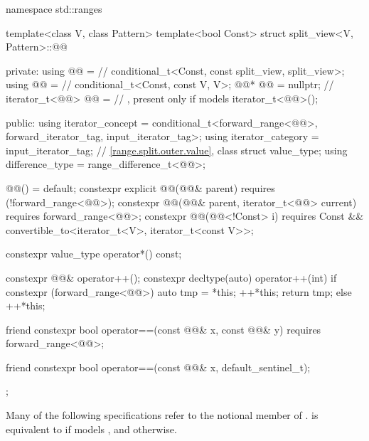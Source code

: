 %
\begin{codeblock}
namespace std::ranges {
  template<class V, class Pattern>
  template<bool Const>
  struct split_view<V, Pattern>::@@ {
  private:
    using @@ =                          // \expos
      conditional_t<Const, const split_view, split_view>;
    using @@   =                          // \expos
      conditional_t<Const, const V, V>;
    @@* @@ = nullptr;              // \expos
    iterator_t<@@> @@ =             // \expos, present only if  models 
      iterator_t<@@>();

  public:
    using iterator_concept  =
      conditional_t<forward_range<@@>, forward_iterator_tag, input_iterator_tag>;
    using iterator_category = input_iterator_tag;
    // \ref{range.split.outer.value}, class 
    struct value_type;
    using difference_type   = range_difference_t<@@>;

    @@() = default;
    constexpr explicit @@(@@& parent)
      requires (!forward_range<@@>);
    constexpr @@(@@& parent, iterator_t<@@> current)
      requires forward_range<@@>;
    constexpr @@(@@<!Const> i)
      requires Const && convertible_to<iterator_t<V>, iterator_t<const V>>;

    constexpr value_type operator*() const;

    constexpr @@& operator++();
    constexpr decltype(auto) operator++(int) {
      if constexpr (forward_range<@@>) {
        auto tmp = *this;
        ++*this;
        return tmp;
      } else
        ++*this;
    }

    friend constexpr bool operator==(const @@& x, const @@& y)
      requires forward_range<@@>;

    friend constexpr bool operator==(const @@& x, default_sentinel_t);
  };
}
\end{codeblock}

\pnum
Many of the following specifications refer to the notional member
 of .
 is equivalent to  if 
models , and  otherwise.

